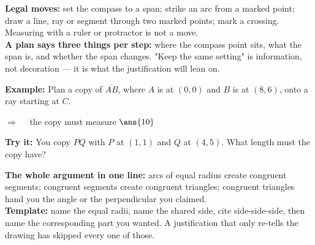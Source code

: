 \documentclass[12pt]{article}
\begin{document}


\begin{formulabox}
\textbf{Legal moves:} set the compass to a span; strike an arc from a marked
point; draw a line, ray or segment through two marked points; mark a crossing.
Measuring with a ruler or protractor is not a move.\\[3pt]
\textbf{A plan says three things per step:} where the compass point sits, what
the span is, and whether the span changes. "Keep the same setting" is
information, not decoration --- it is what the justification will lean on.
\end{formulabox}

\begin{examplebox}
\textbf{Example:} \quad Plan a copy of $\overline{AB}$, where $A$ is at $(0, 0)$
and $B$ is at $(8, 6)$, onto a ray starting at $C$.

$\Rightarrow\quad$ the copy must measure $\ans{10}$
\end{examplebox}

\begin{tryitbox}
\textbf{Try it:} \quad You copy $\overline{PQ}$ with $P$ at $(1, 1)$ and $Q$ at
$(4, 5)$. What length must the copy have?\\[2pt]
\end{tryitbox}


\begin{formulabox}
\textbf{The whole argument in one line:} arcs of equal radius create congruent
segments; congruent segments create congruent triangles; congruent triangles
hand you the angle or the perpendicular you claimed.\\[3pt]
\textbf{Template:} name the equal radii, name the shared side, cite side-side-side,
then name the corresponding part you wanted. A justification that only re-tells
the drawing has skipped every one of those.
\end{formulabox}
\end{document}
